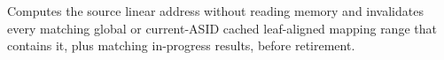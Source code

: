 Computes the source linear address without reading memory and invalidates every matching global or current-ASID cached leaf-aligned mapping range that contains it, plus matching in-progress results, before retirement.
